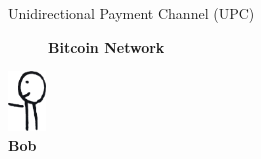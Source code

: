 \documentclass[]{beamer}
\begin{document}
\begin{frame}{Unidirectional Payment Channel (UPC)}
\begin{minipage}{0.8\linewidth}
\begin{figure}
{\begin{figure}
{\begin{tikzpicture}[scale=0.9, every node/.style={scale=0.9}]
			\end{tikzpicture}}
		\end{figure}}	
			\textbf{Bitcoin Network}
		\end{figure}
		\vspace{-2.9cm}	
	\end{minipage}%
\begin{minipage}{0.1\linewidth}
	\vspace{1.46cm}
	\centering
		\includegraphics[width=1cm]{../assets/images/agents/handing_left}
		\\ \hspace{0.3cm}\textbf{Bob}
		\vspace{-0.5cm}
		\begin{figure}
		\hspace{-1.7cm}
		\resizebox{2.5cm}{!}{
				\begin{tikzpicture}[scale=0.7, every node/.style={scale=0.7}]
					
				\end{tikzpicture}}
		\end{figure}
	
\end{minipage}

\end{frame}

\end{document}
